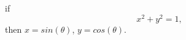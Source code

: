 \documentclass{article}
\begin{document}
	if
\begin{equation}
x^2+y^2 = 1,
\end{equation}
then $x= sin(\theta)$, $y = cos(\theta)$.
\end{document}
